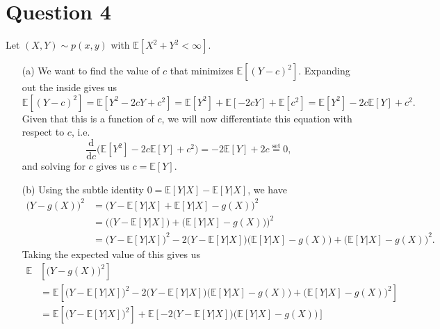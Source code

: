 \documentclass[10pt]{article}
\begin{document}
\section{Question 4} \noindent
Let \((X,Y)\sim p(x,y)\) with \(\mathbb{E}[X^2 + Y^2 < \infty]\).
\begin{itemize}
    \item[(a)] We want to find the value of \(c\) that minimizes \(\mathbb{E}\left[ (Y - c)^2\right]\). Expanding out the inside gives us 
    \[
        \mathbb{E} \left[ (Y - c)^2\right] = \mathbb{E} \left[Y^2 - 2cY + c^2\right]
        = \mathbb{E} \left[Y^2\right] + \mathbb{E} \left[-2cY\right] + \mathbb{E} \left[c^2\right] 
        = \mathbb{E} \left[Y^2\right] - 2c \mathbb{E} \left[Y\right] + c^2.
    \]
    Given that this is a function of \(c\), we will now differentiate this equation with respect to \(c\), i.e. 
    \[
        \frac{\mathrm{d}}{\mathrm{d}c} \Big( \mathbb{E} \left[Y^2\right] - 2c \mathbb{E} \left[Y\right] + c^2 \Big)
        = -2 \mathbb{E}[Y] + 2c \overset{\text{set}}{=} 0,
    \]
    and solving for \(c\) gives us \(c = \mathbb{E}[Y]\).
    \item[(b)] Using the subtle identity \(0 = \mathbb{E}[Y|X] - \mathbb{E}[Y|X]\), we have 
    \begin{align*}
        \big( Y - g(X)\big)^2 &= \big( Y - \mathbb{E}[Y|X] + \mathbb{E}[Y|X] - g(X)\big)^2 \\
        &= \Big( \big( Y - \mathbb{E}[Y|X] \big) + \big( \mathbb{E}[Y|X] - g(X) \big) \Big)^2 \\
        &= \big( Y - \mathbb{E}[Y|X] \big)^2 - 2 \big( Y - \mathbb{E}[Y|X] \big) \big( \mathbb{E}[Y|X] - g(X) \big)
        + \big( \mathbb{E}[Y|X] - g(X) \big)^2.
    \end{align*}
    Taking the expected value of this gives us 
    \begin{align*}
        \mathbb{E}&\left[ \big( Y - g(X)\big)^2 \right] \\
        &= \mathbb{E} \left[ 
            \big( Y - \mathbb{E}[Y|X] \big)^2 - 2 \big( Y - \mathbb{E}[Y|X] \big) \big( \mathbb{E}[Y|X] - g(X) \big)
            + \big( \mathbb{E}[Y|X] - g(X) \big)^2 \right] \\
        &= \mathbb{E}\left[ \big( Y - \mathbb{E}[Y|X] \big)^2 \right]
            + \mathbb{E}\left[ - 2 \big( Y - \mathbb{E}[Y|X] \big) \big( \mathbb{E}[Y|X] - g(X) \big) \right] 

\end{align*}
\end{itemize}
\end{document}
